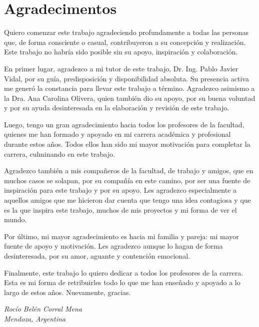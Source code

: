 \chapter*{Agradecimentos}

Quiero comenzar este trabajo agradeciendo profundamente a todas las personas que, de forma consciente o casual, contribuyeron a su concepción y realización. Este trabajo no habría sido posible sin su apoyo, inspiración y colaboración.

En primer lugar, agradezco a mi tutor de este trabajo, Dr. Ing. Pablo Javier Vidal, por su guía, predisposición y disponibilidad absoluta. Su presencia activa me generó la constancia para llevar este trabajo a término. Agradezco asimismo a la Dra. Ana Carolina Olivera, quien también dio su apoyo, por su buena voluntad y por su ayuda desinteresada en la elaboración y revisión de este trabajo.

Luego, tengo un gran agradecimiento hacia todos los profesores de la facultad, quienes me han formado y apoyado en mi carrera académica y profesional durante estos años. Todos ellos han sido mi mayor motivación para completar la carrera, culminando en este trabajo.

Agradezco también a mis compañeros de la facultad, de trabajo y amigos, que en muchos casos se solapan, por su compañía en este camino, por ser una fuente de inspiración para este trabajo y por su apoyo. Les agradezco especialmente a aquellos amigos que me hicieron dar cuenta que tengo una idea contagiosa y que es la que inspira este trabajo, muchos de mis proyectos y mi forma de ver el mundo.

Por último, mi mayor agradecimiento es hacia mi familia y pareja: mi mayor fuente de apoyo y motivación. Les agradezco aunque lo hagan de forma desinteresada, por su amor, aguante y contención emocional.

Finalmente, este trabajo lo quiero dedicar a todos los profesores de la carrera. Esta es mi forma de retribuirles todo lo que me han enseñado y apoyado a lo largo de estos años. Nuevamente, gracias.

\begin{flushright}
  \textit{Rocío Belén Corral Mena} \\
  \textit{Mendoza, Argentina} \\
  \textit{\DTMMonthname{\month} \number\year}
\end{flushright}

